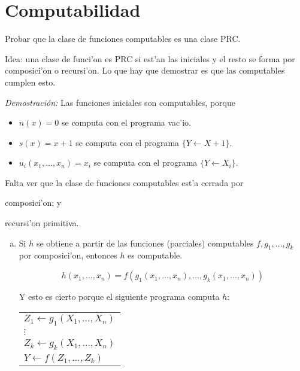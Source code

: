 
\section{Computabilidad}

\begin{questions}
\question Probar que la clase de funciones computables es una clase PRC.


\begin{solution}
  
  Idea: una clase de funci'on es PRC si est'an las iniciales y el resto se forma por composici'on o recursi'on. Lo que hay que demostrar es que las computables cumplen esto. 

  {\it Demostraci\'on: } Las funciones iniciales son computables, porque

  \begin{itemize}
  \item $n(x) = 0$ se computa con el programa vac'io. 
  \item $s(x) = x+1$ se computa con el programa $\{ Y \leftarrow X+1 \}$. 
  \item $u_i(x_1, \dots, x_n) = x_i$ se computa con el programa $\{ Y \leftarrow X_i \}$. 
  \end{itemize}

  Falta ver que la clase de funciones computables est'a cerrada por \begin{inparaenum}[(a)] \item composici'on; y \item recursi'on primitiva. \end{inparaenum}

  \begin{enumerate}[(a)]
  \item Si $h$ se obtiene a partir de las funciones (parciales) computables $f, g_1, \dots, g_k$ por composici'on, entonces $h$ es computable. 
  
  \begin{equation*}
   h(x_1, \dots, x_n) = f(g_1(x_1, \dots, x_n), \dots, g_k(x_1, \dots, x_n))
  \end{equation*}

  Y esto es cierto porque el siguiente programa computa $h$: 
  
  \vspace{0.5cm}
  \begin{tabular}{l}
      $Z_1 \leftarrow g_1(X_1, \dots, X_n)$ \\
      $\vdots$ \\
      $Z_k \leftarrow g_k(X_1, \dots, X_n)$ \\
      $Y \leftarrow f(Z_1, \dots, Z_k)$
  \end{tabular}
  \vspace{0.5cm}
  

\end{enumerate}
\end{solution}
\end{questions}
